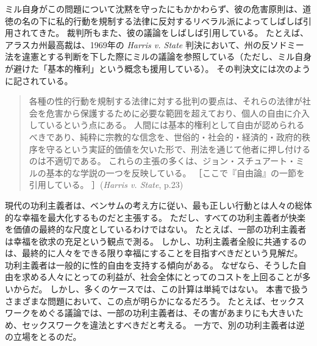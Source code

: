 \documentclass[paper=a4,book,openany]{jlreq}
\begin{document}
ミル自身がこの問題について沈黙を守ったにもかかわらず、彼の危害原則は、道徳の名の下に私的行動を規制する法律に反対するリベラル派によってしばしば引用されてきた。
裁判所もまた、彼の議論をしばしば引用している。
たとえば、アラスカ州最高裁は、1969年の \emph{Harris v. State} 判決において、州の反ソドミー法を違憲とする判断を下した際にミルの議論を参照している（ただし、ミル自身が避けた「基本的権利」という概念も援用している）。
その判決文には次のように記されている。

\begin{quote}
各種の性的行動を規制する法律に対する批判の要点は、それらの法律が社会を危害から保護するために必要な範囲を超えており、個人の自由に介入しているという点にある。
人間には基本的権利として自由が認められるべきであり、純粋に宗教的な信念を、世俗的・社会的・経済的・政府的秩序を守るという実証的価値を欠いた形で、刑法を通じて他者に押し付けるのは不適切である。
これらの主張の多くは、ジョン・スチュアート・ミルの基本的な学説の一つを反映している。
［ここで『自由論』の一節を引用している。
］(\emph{Harris v. State}, p.23)

\end{quote}

現代の功利主義者は、ベンサムの考え方に従い、最も正しい行動とは人々の総体的な幸福を最大化するものだと主張する。
ただし、すべての功利主義者が快楽を価値の最終的な尺度としているわけではない。
たとえば、一部の功利主義者は幸福を欲求の充足という観点で測る。
しかし、功利主義者全般に共通するのは、最終的に人々をできる限り幸福にすることを目指すべきだという見解だ。
功利主義者は一般的に性的自由を支持する傾向がある。
なぜなら、そうした自由を求める人々にとっての利益が、社会全体にとってのコストを上回ることが多いからだ。
しかし、多くのケースでは、この計算は単純ではない。
本書で扱うさまざまな問題において、この点が明らかになるだろう。
たとえば、セックスワークをめぐる議論では、一部の功利主義者は、その害があまりにも大きいため、セックスワークを違法とすべきだと考える。
一方で、別の功利主義者は逆の立場をとるのだ。
\end{document}
